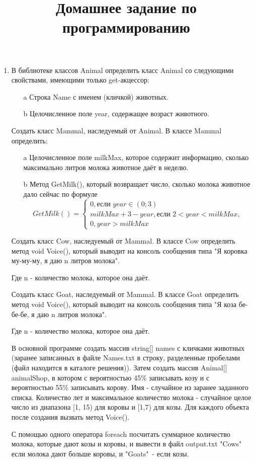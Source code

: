 \documentclass[a4paper,12pt]{article} %
\author{}
\title{Домашнее задание по программированию}
\date{}
\begin{document}
	\maketitle
	
	\begin{enumerate}
		\item \noindent В библиотеке классов Animal определить класс Animal со следующими свойствами, имеющими только get-акцессор:
		\begin{enumerate}
			\item[a] Строка Name с именем (кличкой) животных.
			\item[b] Целочисленное поле year, содержащее возраст животного.
		\end{enumerate}
		Создать класс Mammal, наследуемый от Animal. В классе Mammal определить:
		\begin{enumerate}
			\item[a] Целочисленное поле milkMax, которое содержит информацию, сколько максимально литров молока животное даёт в неделю.
			\item[b] Метод GetMilk(), который возвращает число, сколько молока животное дало сейчас по формуле
			\begin{equation*}
			GetMilk() = 
			\begin{cases}
			0, \text{если } year \in (0;3) 
			\\
			milkMax +3 - year,  \text{если }2 < year < milkMax,
			\\
			0, year> milkMax
			\end{cases}
			\end{equation*}
			
		\end{enumerate}
	Создать класс Cow, наследуемый от Mammal. В классе Cow определить метод void Voice(), который выводит на консоль сообщения типа "Я коровка му-му-му, я даю n литров молока". 
	
	Где n - количество молока, которое она даёт.
	
	Создать класс Goat, наследуемый от Mammal. В классе Goat определить метод void Voice(), который выводит на консоль сообщения типа "Я коза бе-бе-бе, я даю n литров молока". 
	
	Где n - количество молока, которое она даёт.
	
	В основной программе создать массив string[] names с кличками животных (заранее записанных в файле Names.txt в строку, разделенные пробелами (файл находится в каталоге решения)). Затем создать массив Animal[] animalShop, в котором с вероятностью 45\% записывать козу и с вероятностью 55\% записывать корову. Имя - случайное из заранее заданного списка. Количество лет и максимальное количество молока - случайное целое число из диапазона [1, 15) для коровы и [1,7) для козы. Для каждого объекта после создания вызвать метод Voice().
	
	С помощью одного оператора foreach посчитать суммарное количество молока, которые дают козы и коровы, и вывести в файл output.txt "Cows"\, если молока дают больше коровы, и "Goats"\ - если козы.
	
	
	\end{enumerate}
	
\end{document}
